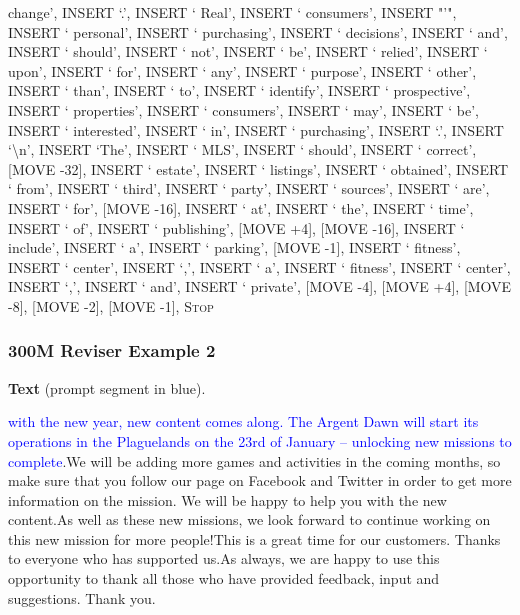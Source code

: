 \documentclass[11pt]{article}
\DeclareRobustCommand{\Stop}{\ifmmode\text{\textsc{Stop}}\else\textsc{Stop}\fi}
\begin{document}
{change', INSERT `.', INSERT ` Real', INSERT ` consumers', INSERT "'", INSERT ` personal', INSERT ` purchasing', INSERT ` decisions', INSERT ` and', INSERT ` should', INSERT ` not', INSERT ` be', INSERT ` relied', INSERT ` upon', INSERT ` for', INSERT ` any', INSERT ` purpose', INSERT ` other', INSERT ` than', INSERT ` to', INSERT ` identify', INSERT ` prospective', INSERT ` properties', INSERT ` consumers', INSERT ` may', INSERT ` be', INSERT ` interested', INSERT ` in', INSERT ` purchasing', INSERT `.', INSERT `\textbackslash{}n', INSERT `The', INSERT ` MLS', INSERT ` should', INSERT ` correct', [MOVE -32], INSERT ` estate', INSERT ` listings', INSERT ` obtained', INSERT ` from', INSERT ` third', INSERT ` party', INSERT ` sources', INSERT ` are', INSERT ` for', [MOVE -16], INSERT ` at', INSERT ` the', INSERT ` time', INSERT ` of', INSERT ` publishing', [MOVE +4], [MOVE -16], INSERT ` include', INSERT ` a', INSERT ` parking', [MOVE -1], INSERT ` fitness', INSERT ` center', INSERT `,', INSERT ` a', INSERT ` fitness', INSERT ` center', INSERT `,', INSERT ` and', INSERT ` private', [MOVE -4], [MOVE +4], [MOVE -8], [MOVE -2], [MOVE -1], \Stop\par
}
\vspace{0.8em}
\subsubsection*{300M Reviser Example 2}
\textbf{Text} (prompt segment in blue).\par
\ttfamily\small \textcolor{blue}{with the new year, new content comes along. The Argent Dawn will start its operations in the Plaguelands on the 23rd of January – unlocking new missions to complete}.\newline We will be adding more games and activities in the coming months, so make sure that you follow our page on Facebook and Twitter in order to get more information on the mission. We will be happy to help you with the new content.\newline As well as these new missions, we look forward to continue working on this new mission for more people!\newline This is a great time for our customers. Thanks to everyone who has supported us.\newline As always, we are happy to use this opportunity to thank all those who have provided feedback, input and suggestions. Thank you.
\end{document}
